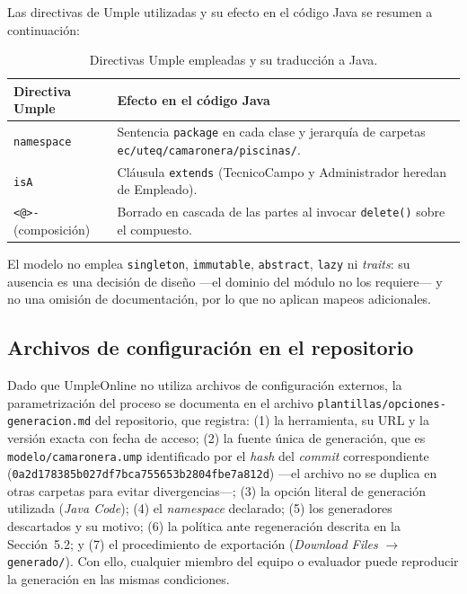 \documentclass[11pt,a4paper]{article}
\begin{document}
Las directivas de Umple utilizadas y su efecto en el código Java se
resumen a continuación:

\begin{table}[H]
  \centering
  \caption{Directivas Umple empleadas y su traducción a Java.}
  \begin{tabular}{|l|p{8.5cm}|}
    \hline
    \textbf{Directiva Umple} & \textbf{Efecto en el código Java} \\
    \hline
    \texttt{namespace} &
      Sentencia \texttt{package} en cada clase y jerarquía de
      carpetas \texttt{ec/uteq/camaronera/piscinas/}. \\
    \hline
    \texttt{isA} &
      Cláusula \texttt{extends} (TecnicoCampo y Administrador heredan
      de Empleado). \\
    \hline
    \texttt{<@>-} (composición) &
      Borrado en cascada de las partes al invocar \texttt{delete()}
      sobre el compuesto. \\
    \hline
  \end{tabular}
\end{table}

El modelo no emplea \texttt{singleton}, \texttt{immutable},
\texttt{abstract}, \texttt{lazy} ni \emph{traits}: su ausencia es una
decisión de diseño ---el dominio del módulo no los requiere--- y no
una omisión de documentación, por lo que no aplican mapeos
adicionales.

\subsection{Archivos de configuración en el repositorio}

Dado que UmpleOnline no utiliza archivos de configuración externos,
la parametrización del proceso se documenta en el archivo
\texttt{plantillas/opciones-generacion.md} del repositorio, que
registra: (1) la herramienta, su URL y la versión exacta con fecha de
acceso; (2) la fuente única de generación, que es
\texttt{modelo/camaronera.ump} identificado por el \emph{hash} del
\emph{commit} correspondiente
(\texttt{0a2d178385b027df7bca755653b2804fbe7a812d}) ---el archivo no se duplica en otras
carpetas para evitar divergencias---; (3) la opción literal de
generación utilizada (\emph{Java Code}); (4) el \emph{namespace}
declarado; (5) los generadores descartados y su motivo; (6) la
política ante regeneración descrita en la Sección~5.2; y (7) el
procedimiento de exportación (\emph{Download Files}
$\rightarrow$ \texttt{generado/}). Con ello, cualquier miembro del
equipo o evaluador puede reproducir la generación en las mismas
condiciones.
\end{document}
